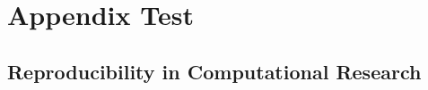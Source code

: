 
\chapter{Appendix Test}




\section{Reproducibility in Computational Research}\label{sec:reproducibility}

\textcite{Sumatra2012}







